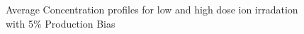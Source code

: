 \documentclass[a4paper]{article}
\begin{document}
      \begin{figure}[h!]  %
        \centering
        \qquad
        \caption{Average Concentration profiles for low and high dose ion irradation with 5\% Production Bias}
        \label{figure:average_concentrations_neutron_5}
      \end{figure}
\end{document}
